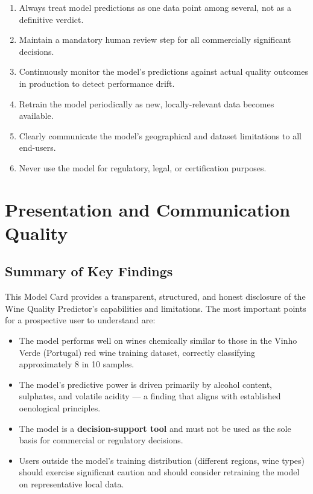 \documentclass[11pt,a4paper]{article}
\begin{document}
\begin{enumerate}[leftmargin=*]
    \item Always treat model predictions as one data point among several, not as a definitive verdict.
    \item Maintain a mandatory human review step for all commercially significant decisions.
    \item Continuously monitor the model's predictions against actual quality outcomes in production to detect performance drift.
    \item Retrain the model periodically as new, locally-relevant data becomes available.
    \item Clearly communicate the model's geographical and dataset limitations to all end-users.
    \item Never use the model for regulatory, legal, or certification purposes.
\end{enumerate}

\section{Presentation and Communication Quality}

\subsection{Summary of Key Findings}

This Model Card provides a transparent, structured, and honest disclosure of the Wine Quality Predictor's capabilities and limitations. The most important points for a prospective user to understand are:

\begin{itemize}[leftmargin=*]
    \item The model performs well on wines chemically similar to those in the Vinho Verde (Portugal) red wine training dataset, correctly classifying approximately 8 in 10 samples.
    \item The model's predictive power is driven primarily by alcohol content, sulphates, and volatile acidity --- a finding that aligns with established oenological principles.
    \item The model is a \textbf{decision-support tool} and must not be used as the sole basis for commercial or regulatory decisions.
    \item Users outside the model's training distribution (different regions, wine types) should exercise significant caution and should consider retraining the model on representative local data.
\end{itemize}
\end{document}
